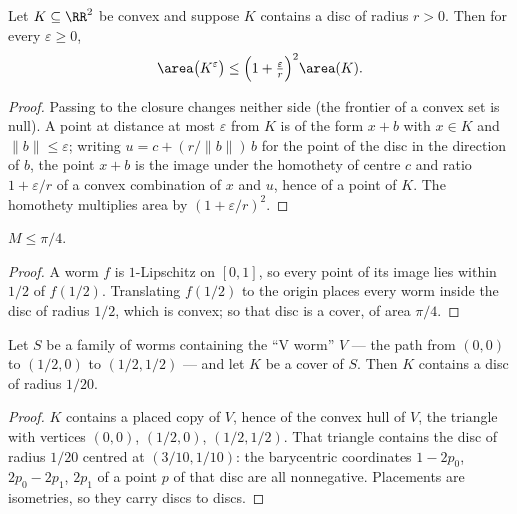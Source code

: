 \begin{theorem}
    \label{thm:dilationBound}
    \leanok
    Let $K \subseteq \RR^2$ be convex and suppose $K$ contains a disc of radius
    $r > 0$. Then for every $\varepsilon \ge 0$,
    \[
        \area\big(K^{\varepsilon}\big)
            \le \Big(1 + \tfrac{\varepsilon}{r}\Big)^{2} \area(K).
    \]
\end{theorem}
\begin{proof}
    \leanok
    Passing to the closure changes neither side (the frontier of a convex set is
    null). A point at distance at most $\varepsilon$ from $K$ is of the form
    $x + b$ with $x \in K$ and $\lVert b\rVert \le \varepsilon$; writing
    $u = c + (r/\lVert b\rVert)\, b$ for the point of the disc in the direction
    of $b$, the point $x + b$ is the image under the homothety of centre $c$ and
    ratio $1 + \varepsilon/r$ of a convex combination of $x$ and $u$, hence of a
    point of $K$. The homothety multiplies area by $(1 + \varepsilon/r)^2$.
\end{proof}

\begin{theorem}
    \label{thm:apriori}
    \leanok
    $M \le \pi/4$.
\end{theorem}
\begin{proof}
    \leanok
    A worm $f$ is $1$-Lipschitz on $[0,1]$, so every point of its image lies
    within $1/2$ of $f(1/2)$. Translating $f(1/2)$ to the origin places every
    worm inside the disc of radius $1/2$, which is convex; so that disc is a
    cover, of area $\pi/4$.
\end{proof}

\begin{theorem}
    \label{thm:coverDisc}
    \leanok
    Let $S$ be a family of worms containing the ``V worm'' $V$ --- the path from
    $(0,0)$ to $(1/2,0)$ to $(1/2,1/2)$ --- and let $K$ be a cover of $S$. Then
    $K$ contains a disc of radius $1/20$.
\end{theorem}
\begin{proof}
    \leanok
    $K$ contains a placed copy of $V$, hence of the convex hull of $V$, the
    triangle with vertices $(0,0)$, $(1/2,0)$, $(1/2,1/2)$. That triangle
    contains the disc of radius $1/20$ centred at $(3/10, 1/10)$: the
    barycentric coordinates $1 - 2p_0$, $2p_0 - 2p_1$, $2p_1$ of a point $p$ of
    that disc are all nonnegative. Placements are isometries, so they carry
    discs to discs.
\end{proof}


